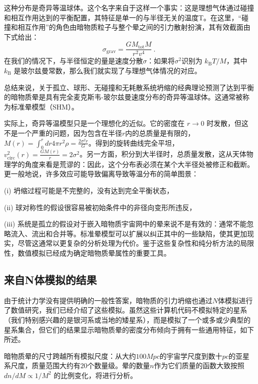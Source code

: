 这种分布是奇异等温球体。这个名字来自于这样一个事实：这是理想气体通过碰撞和相互作用达到的平衡配置，其特征是单一的与半径无关的温度T。在这里，“碰撞和相互作用”的角色由暗物质粒子与整个晕之间的引力散射扮演，其有效截面由下式给出：
\begin{equation}
\sigma_{\text{grav}} = \frac{G M_{\text{tot}} M}{r^2 v^4}~. 
\end{equation}
在我们的情况下，与半径恒定的量是速度分散$\sigma$：如果将$\sigma^2$识别为 \( k_{\text{B}} T/M \)，其中 \( k_{\text{B}} \) 是玻尔兹曼常数，那么我们就实现了与理想气体情况的对应。

总结来说，关于孤立、球形、无碰撞和无耗散系统坍缩的经典理论预测了达到平衡的暗物质晕是具有完全麦克斯韦-玻尔兹曼速度分布的奇异等温球体。这通常被称为标准晕模型（SHM）。

实际上，奇异等温模型只是一个理想化的近似。它的密度在 \( r \to 0 \) 时发散，但这不是一个严重的问题，因为包含在半径$r$内的总质量是有限的，\( M(r) = \int_0^r dr 4\pi r^2 \rho = \frac{2\sigma^2 r}{G} \)。得到的旋转曲线完全平坦，\( v_{\text{circ}}^2(r) = \frac{G M(r)}{r} = 2\sigma^2 \)。另一方面，积分到大半径时，总质量发散，这从天体物理学的角度来看是荒谬的：因此，这个分布表必须在某个大半径处被修正和截断。更一般地说，许多效应可能导致偏离导致等温分布的简单图景：

(i) 坍缩过程可能是不完整的，没有达到完全平衡状态，

(ii) 球对称性的假设很容易被初始条件中的非径向变形所违反，

(iii) 系统是孤立的假设对于嵌入暗物质宇宙网中的晕来说不是有效的：通常不能忽略流入、流出和合并等。标准晕模型可以扩展以纠正其中的一些缺陷，使其更加现实，尽管这通常以更复杂的分析处理为代价。鉴于这些复杂性和纯分析方法的局限性，数值模拟已经成为确定暗物质晕属性的重要工具。

\subsection{来自N体模拟的结果}

由于统计力学没有提供明确的一般性答案，暗物质的引力坍缩也通过$N$体模拟进行了数值研究，我们已经介绍了这些模拟。虽然这些计算机代码不模拟特定的星系（我们特别感兴趣的是银河系或当地的矮星系），而是模拟了一个或多或少典型的星系集合，但它们的结果显示暗物质晕的密度分布倾向于拥有一些通用特征，如下所述。

暗物质晕的尺寸跨越所有模拟尺度：从大约$100 Mpc$的宇宙学尺度到数十$pc$的亚星系尺度，质量范围大约有$20$个数量级。晕的数量$ n $作为它们质量的函数大致按照 \( dn/dM \propto 1/M^2 \) 的比例变化，将进行分析。

